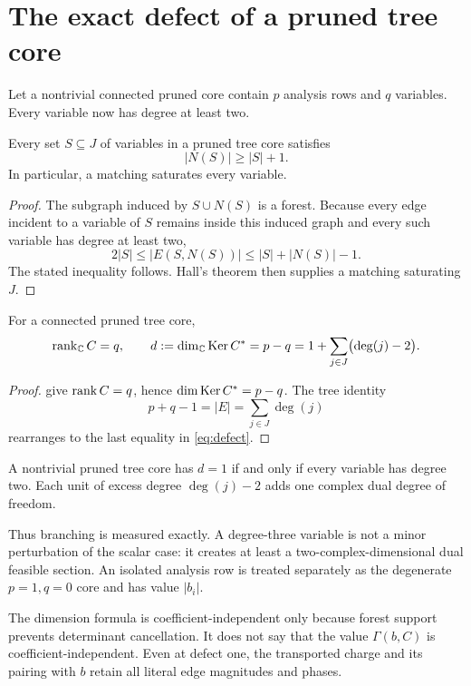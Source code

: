 \section{The exact defect of a pruned tree core}
\label{sec:core-defect}

Let a nontrivial connected pruned core contain \(p\) analysis rows and
\(q\) variables.  Every variable now has degree at least two.

\begin{lemma}\label{lem:var-match}
Every set \(S\subseteq J\) of variables in a pruned tree core satisfies
\[
 |N(S)|\ge |S|+1.
\]
In particular, a matching saturates every variable.
\end{lemma}

\begin{proof}
The subgraph induced by \(S\cup N(S)\) is a forest.  Because every edge
incident to a variable of \(S\) remains inside this induced graph and
every such variable has degree at least two,
\[
 2|S|
 \le |E(S,N(S))|
 \le |S|+|N(S)|-1.
\]
The stated inequality follows.  Hall's theorem then supplies a
matching saturating \(J\).
\end{proof}

\begin{theorem}\label{thm:defect}
For a connected pruned tree core,
\begin{equation}\label{eq:defect}
 \operatorname{rank}_{\mathbb C}C=q,
 \qquad
 d:=\dim_{\mathbb C}\operatorname{Ker} C^*
 =p-q
 =1+\sum_{j\in J}\bigl(\deg(j)-2\bigr).
\end{equation}
\end{theorem}

\begin{proof}
 give \(\operatorname{rank} C=q\), hence
\(\dim\operatorname{Ker} C^*=p-q\).  The tree identity
\[
 p+q-1=|E|=\sum_{j\in J}\deg(j)
\]
rearranges to the last equality in \eqref{eq:defect}.
\end{proof}

\begin{corollary}\label{cor:one-defect-topology}
A nontrivial pruned tree core has \(d=1\) if and only if every variable
has degree two.  Each unit of excess degree
\(\deg(j)-2\) adds one complex dual degree of freedom.
\end{corollary}

Thus branching is measured exactly.  A degree-three variable is not a
minor perturbation of the scalar case: it creates at least a
two-complex-dimensional dual feasible section.  An isolated analysis
row is treated separately as the degenerate \(p=1,q=0\) core and has
value \(|b_i|\).

\begin{remark}
The dimension formula is coefficient-independent only because forest
support prevents determinant cancellation.  It does not say that the
value \(\Gamma(b,C)\) is coefficient-independent.  Even at defect one,
the transported charge and its pairing with \(b\) retain all literal
edge magnitudes and phases.
\end{remark}

